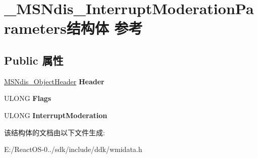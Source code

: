 \hypertarget{struct___m_s_ndis___interrupt_moderation_parameters}{}\section{\+\_\+\+M\+S\+Ndis\+\_\+\+Interrupt\+Moderation\+Parameters结构体 参考}
\label{struct___m_s_ndis___interrupt_moderation_parameters}
\subsection*{Public 属性}
\begin{DoxyCompactItemize}
\item 
\mbox{\label{struct___m_s_ndis___interrupt_moderation_parameters_a120deae7f6aefe213e363249fbf7bda6}} 
\hyperlink{struct___m_s_ndis___object_header}{M\+S\+Ndis\+\_\+\+Object\+Header} {\bfseries Header}
\item 
\mbox{\label{struct___m_s_ndis___interrupt_moderation_parameters_a006dc4f5e3eb7d26f75cd0c0e09f69ac}} 
U\+L\+O\+NG {\bfseries Flags}
\item 
\mbox{\label{struct___m_s_ndis___interrupt_moderation_parameters_acff02e3b61acc0fc02f7ca5c5de5af69}} 
U\+L\+O\+NG {\bfseries Interrupt\+Moderation}
\end{DoxyCompactItemize}


该结构体的文档由以下文件生成\+:\begin{DoxyCompactItemize}
\item 
E\+:/\+React\+O\+S-\/0../sdk/include/ddk/wmidata.\+h\end{DoxyCompactItemize}

